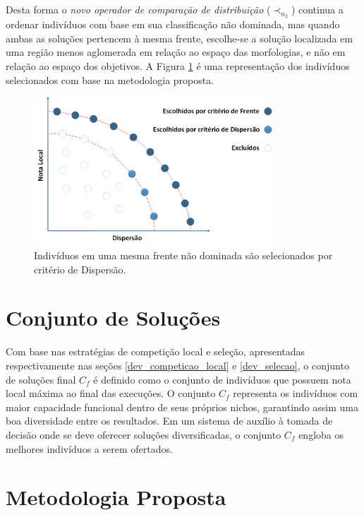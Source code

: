 Desta forma o \emph{novo operador de comparação de distribuição} ($\prec_{n_2}$) continua a ordenar indivíduos com base em sua classificação não dominada, mas quando ambas as soluções pertencem à mesma frente, escolhe-se a solução localizada em uma região menos aglomerada em relação ao espaço das morfologias, e não em relação ao espaço dos objetivos. A Figura \ref{fig:dev_selection} é uma representação dos indivíduos selecionados com base na metodologia proposta.

\begin{figure}[htb]
	\begin{center}
		\includegraphics[width=0.8\textwidth]{Imagens/dev_selection.png}
		\caption{Indivíduos em uma mesma frente não dominada são selecionados por critério de Dispersão.}
		\label{fig:dev_selection}
	\end{center}
\end{figure}

\section{Conjunto de Soluções}
\label{dev_conjunto_solucoes}

Com base nas estratégias de competição local e seleção, apresentadas respectivamente nas seções \ref{dev_competicao_local} e \ref{dev_selecao}, o conjunto de soluções final $C_f$ é definido como o conjunto de indivíduos que possuem nota local máxima ao final das execuções. O conjunto $C_f$ representa os indivíduos com maior capacidade funcional dentro de seus próprios nichos, garantindo assim uma boa diversidade entre os resultados. Em um sistema de auxílio à tomada de decisão onde se deve oferecer soluções diversificadas, o conjunto $C_f$ engloba os melhores indivíduos a serem ofertados.

\section{Metodologia Proposta}

